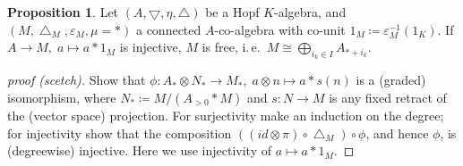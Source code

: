 \documentclass[english]{scrartcl}
\theoremstyle{definition}
\newtheorem*{Prop}{Proposition}
\theoremstyle{remark}
\newcommand*{\idest}{i.\,e.\ }
\newcommand*{\mult}{\bigtriangledown} %
\newcommand*{\comult}{\bigtriangleup} %
\newcommand*{\unit}{\eta} %
\newcommand*{\counit}{\varepsilon} %
\newcommand*{\multmod}{\mu} %
\newcommand*{\m}{*} %
\newcommand*{\one}[1]{1_{#1}} %
\begin{document}
\begin{Prop}
  Let $(A,\mult, \unit, \comult)$ be a Hopf $K$-algebra, and
  $(M,\comult_M,\counit_M, \multmod=\m)$ a connected $A$-co-algebra with
  co-unit $\one{M}\coloneqq \counit_M^{-1}(\one{K})$.
  If $A\to M,\;a\mapsto a\m \one{M}$ is injective, $M$ is free,
  \idest $M\cong \bigoplus_{i_k\in I} A_{*+i_k}$.
  \begin{proof}[proof (scetch)] \cite[see][Lemma p.\,94]{stong}
    Show that
    $\phi\colon A_*\otimes N_*\to M_*,\;a\otimes n\mapsto a\m s(n)$
    is a (graded) isomorphism, where $N_*\coloneqq M/(A_{>0}\m M)$ and
    $s\colon N\to M$ is any fixed retract of the (vector space) projection.
    For surjectivity make an induction on the degree;
    for injectivity show that the composition
    $((id\otimes\pi)\circ\comult_M) \circ \phi$,
    and hence $\phi$, is (degreewise) injective. Here we use
    injectivity of $a\mapsto a\m 1_M$.
  \end{proof}
\end{Prop}


\nocite{*}
\printbibliography
\end{document}

